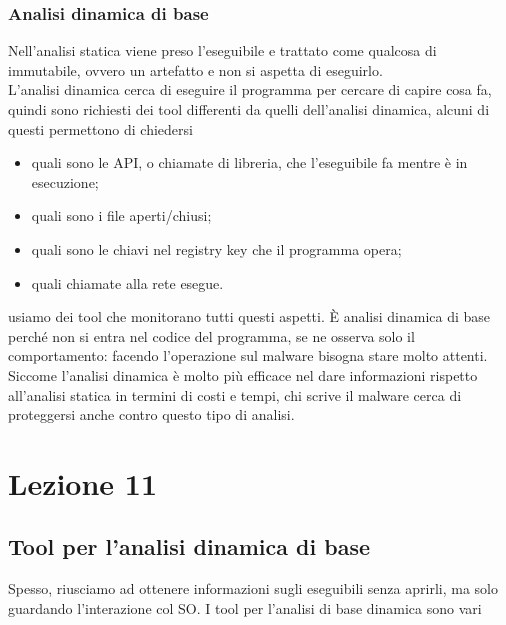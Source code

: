 \documentclass[12pt, oneside]{extbook}
\begin{document}
\subsection{Analisi dinamica di base}
Nell'analisi statica viene preso l'eseguibile e trattato come qualcosa di immutabile, ovvero un artefatto e non si aspetta di eseguirlo. \\ L'analisi dinamica cerca di eseguire il programma per cercare di capire cosa fa, quindi sono richiesti dei tool differenti da quelli dell'analisi dinamica, alcuni di questi permettono di chiedersi 
\begin{itemize}
\item quali sono le API, o chiamate di libreria, che l'eseguibile fa mentre è in esecuzione;
\item quali sono i file aperti/chiusi;
\item quali sono le chiavi nel registry key che il programma opera;
\item quali chiamate alla rete esegue.
\end{itemize}
usiamo dei tool che monitorano tutti questi aspetti. È analisi dinamica di base perché non si entra nel codice del programma, se ne osserva solo il comportamento: facendo l'operazione sul malware bisogna stare molto attenti. Siccome l'analisi dinamica è molto più efficace nel dare informazioni rispetto all'analisi statica in termini di costi e tempi, chi scrive il malware cerca di proteggersi anche contro questo tipo di analisi.
\chapter{Lezione 11}
\section{Tool per l'analisi dinamica di base}
Spesso, riusciamo ad ottenere informazioni sugli eseguibili senza aprirli, ma solo guardando l'interazione col SO. I tool per l'analisi di base dinamica sono vari
\end{document}
